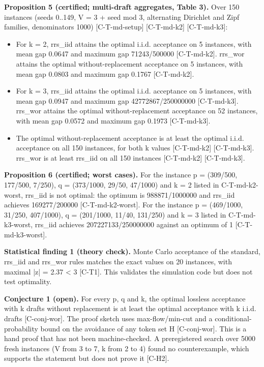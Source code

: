 \documentclass[10pt,twocolumn]{article}
\begin{document}
\textbf{Proposition 5 (certified; multi-draft aggregates, Table 3).} Over 150 instances (seeds 0..149, V = 3 + seed mod 3, alternating Dirichlet and Zipf families, denominators 1000) {\scriptsize[C-T-md-setup]} {\scriptsize[C-T-md-k2]} {\scriptsize[C-T-md-k3]}:

\begin{itemize}
\item For k = 2, rrs\_iid attains the optimal i.i.d. acceptance on 5 instances, with mean gap 0.0647 and maximum gap 71243/500000 {\scriptsize[C-T-md-k2]}. rrs\_wor attains the optimal without-replacement acceptance on 5 instances, with mean gap 0.0803 and maximum gap 0.1767 {\scriptsize[C-T-md-k2]}.
\item For k = 3, rrs\_iid attains the optimal i.i.d. acceptance on 5 instances, with mean gap 0.0947 and maximum gap 42772867/250000000 {\scriptsize[C-T-md-k3]}. rrs\_wor attains the optimal without-replacement acceptance on 52 instances, with mean gap 0.0572 and maximum gap 0.1973 {\scriptsize[C-T-md-k3]}.
\item The optimal without-replacement acceptance is at least the optimal i.i.d. acceptance on all 150 instances, for both k values {\scriptsize[C-T-md-k2]} {\scriptsize[C-T-md-k3]}. rrs\_wor is at least rrs\_iid on all 150 instances {\scriptsize[C-T-md-k2]} {\scriptsize[C-T-md-k3]}.
\end{itemize}

\textbf{Proposition 6 (certified; worst cases).} For the instance p = (309/500, 177/500, 7/250), q = (373/1000, 29/50, 47/1000) and k = 2 listed in C-T-md-k2-worst, rrs\_iid is not optimal: the optimum is 988871/1000000 and rrs\_iid achieves 169277/200000 {\scriptsize[C-T-md-k2-worst]}. For the instance p = (469/1000, 31/250, 407/1000), q = (201/1000, 11/40, 131/250) and k = 3 listed in C-T-md-k3-worst, rrs\_iid achieves 207227133/250000000 against an optimum of 1 {\scriptsize[C-T-md-k3-worst]}.

\textbf{Statistical finding 1 (theory check).} Monte Carlo acceptance of the standard, rrs\_iid and rrs\_wor rules matches the exact values on 20 instances, with maximal |z| = 2.37 < 3 {\scriptsize[C-T1]}. This validates the simulation code but does not test optimality.

\textbf{Conjecture 1 (open).} For every p, q and k, the optimal lossless acceptance with k drafts without replacement is at least the optimal acceptance with k i.i.d. drafts {\scriptsize[C-conj-wor]}. The proof sketch uses max-flow/min-cut and a conditional-probability bound on the avoidance of any token set H {\scriptsize[C-conj-wor]}. This is a hand proof that has not been machine-checked. A preregistered search over 5000 fresh instances (V from 3 to 7, k from 2 to 4) found no counterexample, which supports the statement but does not prove it {\scriptsize[C-H2]}.
\end{document}

